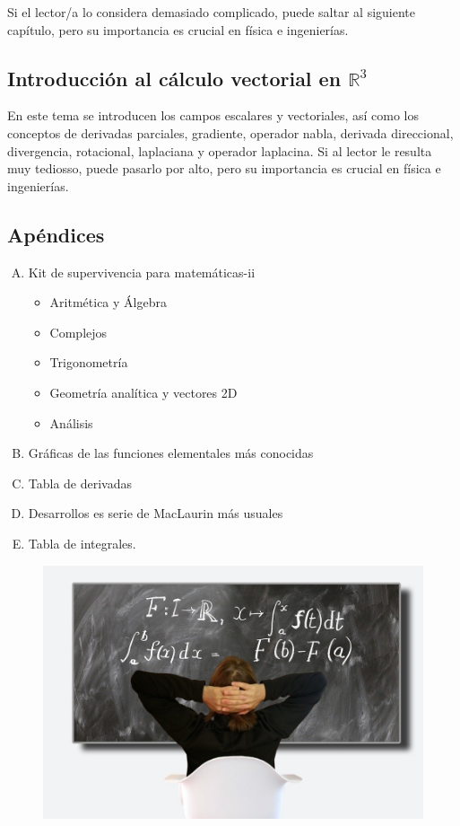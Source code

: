 Si el lector/a lo considera demasiado complicado, puede saltar al siguiente capítulo, pero su importancia es crucial en física e ingenierías.

\subsection{Introducción al cálculo vectorial en $\mathbb R^3$}

En este tema se introducen los campos escalares y vectoriales, así como los conceptos de derivadas parciales, gradiente, operador nabla, derivada direccional, divergencia, rotacional, laplaciana y operador laplacina. Si al lector le resulta muy tediosso, puede pasarlo por alto, pero su importancia es crucial en física e ingenierías.

\subsection{Apéndices}
\begin{enumerate}[A) ]
\item Kit de supervivencia para matemáticas-ii
	\begin{itemize}
	\item Aritmética y Álgebra
	\item Complejos
	\item Trigonometría
	\item Geometría analítica y vectores 2D	
	\item Análisis
	\end{itemize}
\item Gráficas de las funciones elementales más conocidas
\item Tabla de derivadas
\item Desarrollos es serie de MacLaurin más usuales
\item Tabla de integrales. 
\end{enumerate}


\begin{figure}[H]
	\centering
	\includegraphics[width=1\textwidth]{imagenes/imagenes00/xiste00.png}
\end{figure}


